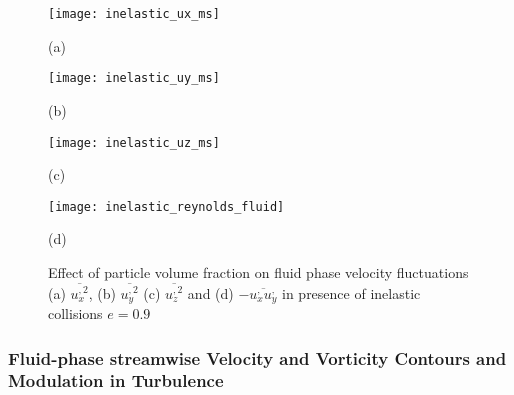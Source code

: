 \documentclass[aip,graphicx]{revtex4-1}
\begin{document}
\begin{figure*}[h!]
    \begin{minipage}{0.45\textwidth}
        	\texttt{[image: inelastic\_ux\_ms]}
    	\caption*{(a)}
    \end{minipage}
    \begin{minipage}{0.45\textwidth}
  	\texttt{[image: inelastic\_uy\_ms]}
  	\caption*{(b)}
  	\end{minipage}
  	\begin{minipage}{0.45\textwidth}
  	\texttt{[image: inelastic\_uz\_ms]}
  	\caption*{(c)}
  	\end{minipage}
  	\begin{minipage}{0.45\textwidth}
  	\texttt{[image: inelastic\_reynolds\_fluid]}
  	\caption*{(d)}
  	\end{minipage}
  	\caption{Effect of particle volume fraction on fluid phase velocity fluctuations (a) $\overline{u_x^{,2}}$, (b) $\overline{u_y^{,2}}$ (c) $\overline{u_z^{,2}}$ and (d) $-\overline{u_x^,u_y^,}$ in presence of inelastic collisions $e=0.9$}
  	\label{fig:inelastic_uu_ms}
    \end{figure*}
\subsubsection{\textbf{Fluid-phase streamwise Velocity and Vorticity Contours and Modulation in Turbulence}}
\end{document}
